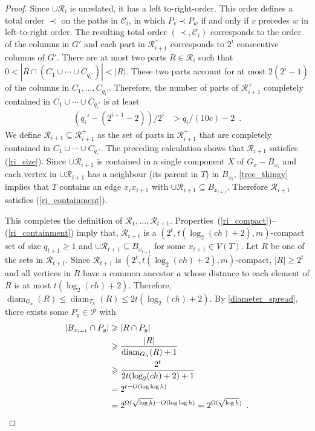 \documentclass{patmorin}
\DeclareMathOperator{\diam}{diam}
\renewcommand{\le}{\leqslant}
\renewcommand{\ge}{\geqslant}
\begin{document}
\begin{proof}
  Since $\cup\mathcal{R}_i$ is unrelated, it has a left to-right-order. This order defines a total order $\prec$ on the paths in $\mathcal{C}_i$, in which $P_v\prec P_w$ if and only if $v$ precedes $w$ in left-to-right order. The resulting total order $(\prec,\mathcal{C}_i)$ corresponds to the order of the columns in $G'$ and each part in $\mathcal{R}_{i+1}^+$ corresponds to $2^i$ consecutive columns of $G'$. There are at most two parts $R\in\mathcal{R}_i$ such that $0 < |R\cap (C_1\cup\cdots\cup C_{q_i'})| < |R|$.  These two parts account for at most $2(2^{i}-1)$ of the columns in $C_1,\ldots, C_{q_i'}$.  Therefore, the number of parts of $\mathcal{R}_{i+1}^+$ completely contained in $C_1\cup\cdots\cup C_{q_i'}$ is at least
  \begin{align*}
      (q_i'-(2^{i+1}-2))/2^i & > q_i/(10c) - 2 \enspace .
  \end{align*}
  We define $\mathcal{R}_{i+1}\subseteq\mathcal{R}_{i+1}^+$ as the set of parts in $\mathcal{R}_{i+1}^+$ that are completely contained in $C_1\cup\cdots\cup C_{q_i'}$.  The preceding calculation shows that $\mathcal{R}_{i+1}$ satisfies (\ref{ri_size}).  Since $\cup\mathcal{R}_{i+1}$ is contained in a single component $X$ of $G_x-B_{x_i}$ and each vertex in $\cup\mathcal{R}_{i+1}$ has a neighbour (its parent in $T$) in $B_{x_i}$, \cref{tree_thingy} implies that $T$ contains an edge $x_{i}x_{i+1}$ with $\cup\mathcal{R}_{i+1}\subseteq B_{x_{i+1}}$. Therefore $\mathcal{R}_{i+1}$ satisfies (\ref{ri_containment}).

  This completes the definition of $\mathcal{R}_1,\ldots,\mathcal{R}_{t+1}$. Properties~(\ref{ri_compact})--(\ref{ri_containment}) imply that, $\mathcal{R}_{t+1}$ is a $(2^t,t(\log_2(ch)+2),m)$-compact set of size $q_{t+1} \ge 1$ and $\cup\mathcal{R}_{t+1}\subseteq B_{x_{t+1}}$ for some $x_{t+1}\in V(T)$.
  Let $R$ be one of the sets in $\mathcal{R}_{t+1}$.  Since $\mathcal{R}_{t+1}$ is $(2^t,t(\log_2(ch)+2),m)$-compact, $|R|\ge 2^t$ and all vertices in $R$ have a common ancestor $a$ whose distance to each element of $R$ is at most $t(\log_2(ch)+2)$.  Therefore, $\diam_{G_h}(R)\le\diam_{T_h}(R)\le 2t(\log_2(ch)+2)$. By \cref{diameter_spread}, there exists some $P_y\in\mathcal{P}$ with
  \begin{align*}
    |B_{x_{t+1}}\cap P_y|
    & \ge |R\cap P_y| \\
    & \ge \frac{|R|}{\diam_{G_h}(R)+1} \\
    & \ge \frac{2^t}{2t(\log_2(ch)+2)+1} \\
    & = 2^{t-O(\log\log h)} \\
    & = 2^{\Omega(\sqrt{\log h})-O(\log\log h)}
   = 2^{\Omega(\sqrt{\log h})} \enspace . \qedhere
  \end{align*}
\end{proof}
\end{document}
